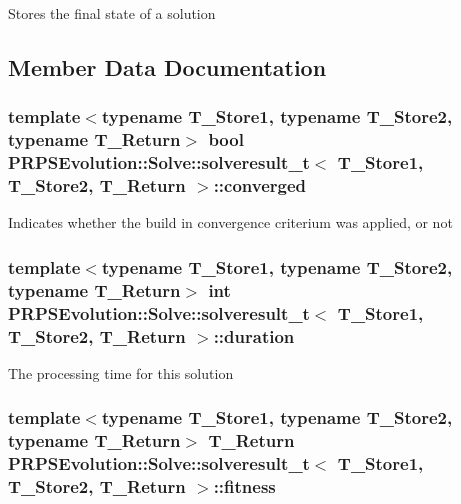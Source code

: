 \-Stores the final state of a solution 

\subsection{\-Member \-Data \-Documentation}
\hypertarget{struct_p_r_p_s_evolution_1_1_solve_1_1solveresult__t_a3f95d8ab798f1c94c65caf7b8231461b}{
\subsubsection[{converged}]{\setlength{\rightskip}{0pt plus 5cm}template$<$typename \-T\-\_\-\-Store1, typename \-T\-\_\-\-Store2, typename \-T\-\_\-\-Return$>$ bool {\bf \-P\-R\-P\-S\-Evolution\-::\-Solve\-::solveresult\-\_\-t}$<$ \-T\-\_\-\-Store1, \-T\-\_\-\-Store2, \-T\-\_\-\-Return $>$\-::{\bf converged}}}\label{struct_p_r_p_s_evolution_1_1_solve_1_1solveresult__t_a3f95d8ab798f1c94c65caf7b8231461b}
\-Indicates whether the build in convergence criterium was applied, or not \hypertarget{struct_p_r_p_s_evolution_1_1_solve_1_1solveresult__t_ac391447c4640f2c3e9c9a2a07f6218a8}{
\subsubsection[{duration}]{\setlength{\rightskip}{0pt plus 5cm}template$<$typename \-T\-\_\-\-Store1, typename \-T\-\_\-\-Store2, typename \-T\-\_\-\-Return$>$ int {\bf \-P\-R\-P\-S\-Evolution\-::\-Solve\-::solveresult\-\_\-t}$<$ \-T\-\_\-\-Store1, \-T\-\_\-\-Store2, \-T\-\_\-\-Return $>$\-::{\bf duration}}}\label{struct_p_r_p_s_evolution_1_1_solve_1_1solveresult__t_ac391447c4640f2c3e9c9a2a07f6218a8}
\-The processing time for this solution \hypertarget{struct_p_r_p_s_evolution_1_1_solve_1_1solveresult__t_ad5da06f8fa0f601b2a573c782ff096fb}{
\subsubsection[{fitness}]{\setlength{\rightskip}{0pt plus 5cm}template$<$typename \-T\-\_\-\-Store1, typename \-T\-\_\-\-Store2, typename \-T\-\_\-\-Return$>$ \-T\-\_\-\-Return {\bf \-P\-R\-P\-S\-Evolution\-::\-Solve\-::solveresult\-\_\-t}$<$ \-T\-\_\-\-Store1, \-T\-\_\-\-Store2, \-T\-\_\-\-Return $>$\-::{\bf fitness}}}\label{struct_p_r_p_s_evolution_1_1_solve_1_1solveresult__t_ad5da06f8fa0f601b2a573c782ff096fb}
